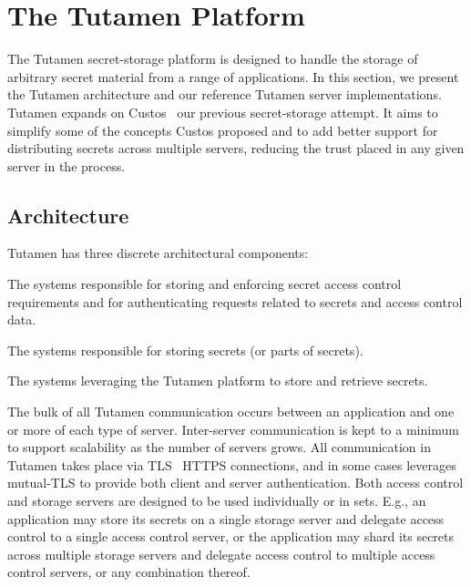 \section{The Tutamen Platform}
\label{sec:tutamen}

The Tutamen secret-storage platform is designed to handle the storage
of arbitrary secret material from a range of applications.  In this
section, we present the Tutamen architecture and our reference Tutamen
server implementations. Tutamen expands on Custos~\cite{custos-trios}
our previous secret-storage attempt. It aims to simplify some of the
concepts Custos proposed and to add better support for distributing
secrets across multiple servers, reducing the trust placed in any
given server in the process.

\subsection{Architecture}
\label{sec:tutamen:arch}

Tutamen has three discrete architectural components:

\begin{packed_desc}
\item[Access Control Servers (ACS):] The systems responsible for
  storing and enforcing secret access control requirements and for
  authenticating requests related to secrets and access control data.
\item[Storage Servers (SS):] The systems responsible for storing
  secrets (or parts of secrets).
\item[Applications:] The systems leveraging the Tutamen platform to
  store and retrieve secrets.
\end{packed_desc}

The bulk of all Tutamen communication occurs between an application
and one or more of each type of server. Inter-server communication is
kept to a minimum to support scalability as the number of servers
grows. All communication in Tutamen takes place via
TLS~\cite{dierks2008} HTTPS connections, and in some cases leverages
mutual-TLS to provide both client and server authentication. Both
access control and storage servers are designed to be used
individually or in sets. E.g., an application may store its secrets on
a single storage server and delegate access control to a single access
control server, or the application may shard its secrets across
multiple storage servers and delegate access control to multiple
access control servers, or any combination thereof.

